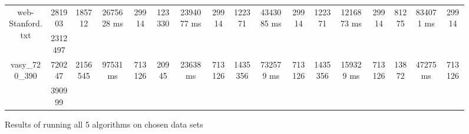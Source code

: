 \documentclass[../master/master.tex]{subfiles}
\begin{document}
\begin{figure}
\begin{adjustbox}{angle=90}
\begin{tabular}{ |c|c||c|c|c||c|c|c||c|c|c||c|c|c||c|c|c|| }
\hline
\multirow{2}{3.6em}{web-Stanford.txt} & 281903 & \multirow{2}{3.6em}{185712} & \multirow{2}{3.6em}{2675628 ms} & \multirow{2}{3.6em}{29914} & \multirow{2}{3.6em}{123330} & \multirow{2}{3.6em}{2394077 ms} & \multirow{2}{3.6em}{29914} & \multirow{2}{3.6em}{122371} & \multirow{2}{3.6em}{4343085 ms} & \multirow{2}{3.6em}{29914} & \multirow{2}{3.6em}{122371} & \multirow{2}{3.6em}{1216873 ms} & \multirow{2}{3.6em}{29914} & \multirow{2}{3.6em}{81275} & \multirow{2}{3.6em}{834071 ms} & \multirow{2}{3.6em}{29914} \\
\cline{2-2}
 & 2312497  &  &  &  &  &  &  &  &  &  &  &  &  &  &  &  \\
\hline
\multirow{2}{3.6em}{vasy\_720\_390} & 720247 & \multirow{2}{3.6em}{2156545} & \multirow{2}{3.6em}{97531 ms} & \multirow{2}{3.6em}{713126} & \multirow{2}{3.6em}{20945} & \multirow{2}{3.6em}{23638 ms} & \multirow{2}{3.6em}{713126} & \multirow{2}{3.6em}{1435356} & \multirow{2}{3.6em}{732579 ms} & \multirow{2}{3.6em}{713126} & \multirow{2}{3.6em}{1435356} & \multirow{2}{3.6em}{159329 ms} & \multirow{2}{3.6em}{713126} & \multirow{2}{3.6em}{13872} & \multirow{2}{3.6em}{47275 ms} & \multirow{2}{3.6em}{713126} \\
\cline{2-2}
 & 390999  &  &  &  &  &  &  &  &  &  &  &  &  &  &  &  \\
\hline
\end{tabular}
\end{adjustbox}
\caption{Results of running all 5 algorithms on chosen data sets}
\label{fig:data}
\end{figure}
\end{document}

